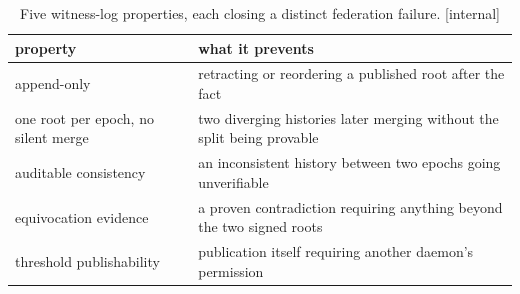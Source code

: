 %
\begin{table}[H]
\centering
\caption{Five witness-log properties, each closing a distinct federation
failure. [internal]}
\label{tab:fh-witness-log}
\small
\renewcommand{\arraystretch}{1.2}
\begin{tabularx}{\linewidth}{@{}l >{\raggedright\arraybackslash}X@{}}
\toprule
\textbf{property} & \textbf{what it prevents} \\
\midrule
append-only & retracting or reordering a published root after the fact \\
one root per epoch, no silent merge & two diverging histories later merging without the split being provable \\
auditable consistency & an inconsistent history between two epochs going unverifiable \\
equivocation evidence & a proven contradiction requiring anything beyond the two signed roots \\
threshold publishability & publication itself requiring another daemon's permission \\
\bottomrule
\end{tabularx}
\end{table}
